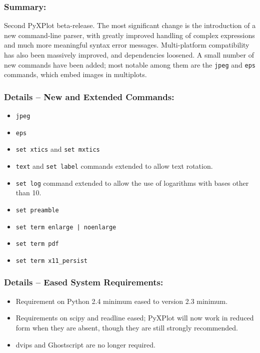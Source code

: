 \subsubsection*{Summary:}

Second PyXPlot beta-release. The most significant change is the introduction of
a new command-line parser, with greatly improved handling of complex
expressions and much more meaningful syntax error messages. Multi-platform
compatibility has also been massively improved, and dependencies loosened.  A
small number of new commands have been added; most notable among them are the
{\tt jpeg} and {\tt eps} commands, which embed images in multiplots.

\subsubsection*{Details -- New and Extended Commands:}

\begin{itemize}
\item {\tt jpeg}
\item {\tt eps}
\item {\tt set xtics} and {\tt set mxtics}
\item {\tt text} and {\tt set label} commands extended to allow text rotation.
\item {\tt set log} command extended to allow the use of logarithms with bases other than 10.
\item {\tt set preamble}
\item {\tt set term enlarge | noenlarge}
\item {\tt set term pdf}
\item {\tt set term x11\_persist}
\end{itemize}

\subsubsection*{Details -- Eased System Requirements:}

\begin{itemize}
\item Requirement on Python 2.4 minimum eased to version 2.3 minimum.
\item Requirements on scipy and readline eased; PyXPlot will now work in reduced form when they are absent, though they are still strongly recommended.
\item dvips and Ghostscript are no longer required.
\end{itemize}

